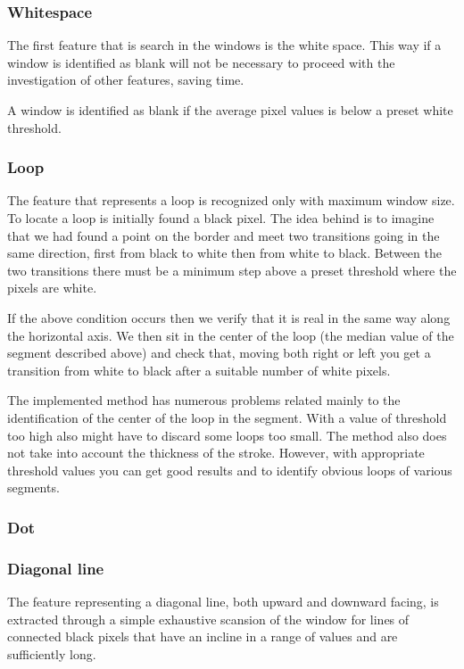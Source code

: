 
\subsubsection{Whitespace}  

The first feature that is search in the windows is the white space. This way if a window is identified as blank will not be necessary to proceed with the investigation of other features, saving time.

A window is identified as blank if the average pixel values is below a preset white threshold.

\subsubsection{Loop}

The feature that represents a loop is recognized only with maximum window size.
To locate a loop is initially found a black pixel. The idea behind is to imagine that we had found a point on the border and meet two transitions going in the same direction, first from black to white then from white to black. Between the two transitions there must be a minimum step above a preset threshold where the pixels are white.

If the above condition occurs then we verify that it is real in the same way along the horizontal axis. We then sit in the center of the loop (the median value of the segment described above) and check that, moving both right or left you get a transition from white to black after a suitable number of white pixels.

The implemented method has numerous problems related mainly to the identification of the center of the loop in the segment. With a value of threshold too high also might have to discard some loops too small. The method also does not take into account the thickness of the stroke.
However, with appropriate threshold values you can get good results and to identify obvious loops of various segments.

\subsubsection{Dot}

\subsubsection{Diagonal line}
The feature representing a diagonal line, both upward and downward facing, is extracted through a simple exhaustive scansion of the window for lines of connected black pixels that have an incline in a range of values and are sufficiently long.


